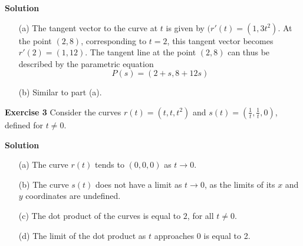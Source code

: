 \documentclass[12pt,oneside]{exam}
\newenvironment{exercise}[1]{\vspace{.1in}\noindent\textbf{Exercise #1 \hspace{.05em}}}{}
\newenvironment{newsolution}{\vspace{.1in}\noindent\textbf{Solution \hspace{.05em}}}{}
\begin{document}
\begin{newsolution}
\begin{itemize}
\item[(a)] The tangent vector to the curve at $t$ is given by $(r'(t)=(1,3t^2)$. At the point $(2,8)$, corresponding to $t=2$, this tangent vector becomes $r'(2)=(1,12)$.  The tangent line at the point $(2,8)$ can thus be described by the parametric equation
\begin{equation*}
P(s)=(2+s, 8+12s)
\end{equation*}
\item[(b)] Similar to part (a). 
\end{itemize}
\end{newsolution}

\begin{exercise}{3}
Consider the curves $r(t)=(t,t,t^2)$ and $s(t)=\left(\frac{1}{t},\frac{1}{t},0\right)$, defined for $t \neq 0$. 
\end{exercise}

\begin{newsolution}
\begin{itemize}
\item[(a)] The curve $r(t)$ tends to $(0,0,0)$ as $t \to 0$. 
\item[(b)] The curve $s(t)$ does not have a limit as $ t \to 0$, as the limits of its $x$ and $y$ coordinates are undefined. 
\item[(c)] The dot product of the curves is equal to $2$, for all $t \neq 0$. 
\item[(d)] The limit of the dot product as $t$ approaches $0$ is equal to 2. 
\end{itemize}
\end{newsolution}
\end{document}
